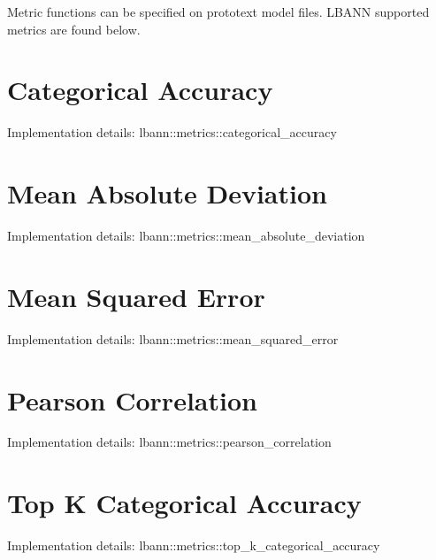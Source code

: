 Metric functions can be specified on prototext model files. L\+B\+A\+NN supported metrics are found below.\hypertarget{metrics_cataccuracy}{}\section{Categorical Accuracy}\label{metrics_cataccuracy}
Implementation details\+: lbann\+::metrics\+::categorical\+\_\+accuracy\hypertarget{metrics_mean_abs_dev}{}\section{Mean Absolute Deviation}\label{metrics_mean_abs_dev}
Implementation details\+: lbann\+::metrics\+::mean\+\_\+absolute\+\_\+deviation\hypertarget{metrics_mse}{}\section{Mean Squared Error}\label{metrics_mse}
Implementation details\+: lbann\+::metrics\+::mean\+\_\+squared\+\_\+error\hypertarget{metrics_pearson}{}\section{Pearson Correlation}\label{metrics_pearson}
Implementation details\+: lbann\+::metrics\+::pearson\+\_\+correlation\hypertarget{metrics_top_k}{}\section{Top K Categorical Accuracy}\label{metrics_top_k}
Implementation details\+: lbann\+::metrics\+::top\+\_\+k\+\_\+categorical\+\_\+accuracy 